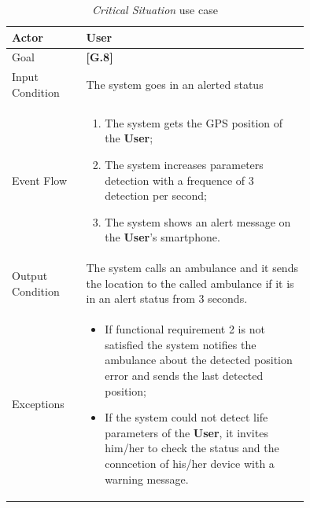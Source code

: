 \begin{center}
\begin{table}[H]
\begin{tabular}{ | l | p{0.75\linewidth} | }
  \hline
    Actor & \textbf{User} \\ \hline
    Goal & \textbf{[G.8]} \\ \hline
    Input Condition & The system goes in an alerted status \\ \hline
    Event Flow & \begin{minipage}[t]{0.7\textwidth}
      \begin{enumerate}
        \item The system gets the GPS position of the \textbf{User};
        \item The system increases parameters detection with a frequence of 3 detection per second;
        \item The system shows an alert message on the \textbf{User}'s smartphone.
      \end{enumerate}
    \smallskip
  \end{minipage} \\ \hline
  Output Condition & The system calls an ambulance and it sends the location to the called ambulance if it is in an alert status from 3 seconds. \\ \hline
  Exceptions & \begin{minipage}[t]{0.7\textwidth}
    \begin{itemize}
      \smallskip
      \item If functional requirement 2 is not satisfied the system notifies the ambulance about the detected position error and sends the last detected position;
      \item If the system could not detect life parameters of the \textbf{User}, it invites him/her to check the status and the conncetion of his/her device with a warning message.
    \end{itemize}
    \smallskip
  \end{minipage}  \\ \hline
\end{tabular}
\caption{\textit{Critical Situation} use case}
\label{table:criticalSituationTable}
\end{table}
\end{center}

